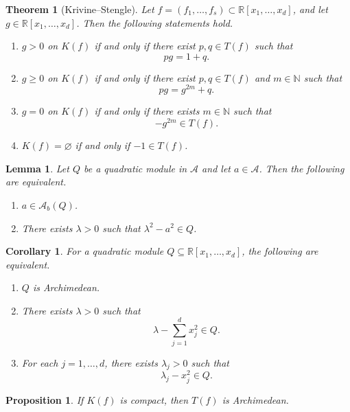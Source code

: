 \documentclass[10pt,a4paper]{amsart}
\newtheorem{theorem}{Theorem}
\newtheorem{lemma}{Lemma}
\newtheorem{corollary}{Corollary}
\newtheorem{proposition}{Proposition}
\newcommand{\Acal}{\mathcal{A}}
\newcommand{\N}{\mathbb{N}}
\newcommand{\R}{\mathbb{R}}
\newcommand{\Rxd}{\R[x_1,\dots,x_d]}
\begin{document}
\begin{theorem}[Krivine--Stengle]\label{thm:ks}
Let \(f=(f_1,\dots,f_s)\subset \Rxd\), and let \(g\in\Rxd\). Then the following statements hold.
\begin{enumerate}[label=\textup{(\arabic*)}, leftmargin=2em]
\item \(g>0\) on \(K(f)\) if and only if there exist \(p,q\in T(f)\) such that
\[
pg=1+q.
\]
\item \(g\ge 0\) on \(K(f)\) if and only if there exist \(p,q\in T(f)\) and \(m\in\N\) such that
\[
pg=g^{2m}+q.
\]
\item \(g=0\) on \(K(f)\) if and only if there exists \(m\in\N\) such that
\[
-g^{2m}\in T(f).
\]
\item \(K(f)=\varnothing\) if and only if \(-1\in T(f)\).
\end{enumerate}
\end{theorem}

\begin{lemma}\label{lem:boundedcriterion}
Let \(Q\) be a quadratic module in \(\Acal\) and let \(a\in\Acal\). Then the following are equivalent.
\begin{enumerate}[label=\textup{(\roman*)}, leftmargin=2em]
\item \(a\in \Acal_b(Q)\).
\item There exists \(\lambda>0\) such that \(\lambda^2-a^2\in Q\).
\end{enumerate}
\end{lemma}

\begin{corollary}\label{cor:archpoly}
For a quadratic module \(Q\subseteq\Rxd\), the following are equivalent.
\begin{enumerate}[label=\textup{(\roman*)}, leftmargin=2em]
\item \(Q\) is Archimedean.
\item There exists \(\lambda>0\) such that
\[
\lambda-\sum_{j=1}^d x_j^2\in Q.
\]
\item For each \(j=1,\dots,d\), there exists \(\lambda_j>0\) such that
\[
\lambda_j-x_j^2\in Q.
\]
\end{enumerate}
\end{corollary}

\begin{proposition}\label{prop:compactimpliesarch}
If \(K(f)\) is compact, then \(T(f)\) is Archimedean.
\end{proposition}
\end{document}
